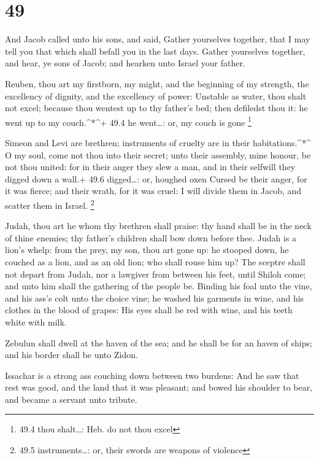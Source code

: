 \hypertarget{section-48}{%
\section{49}\label{section-48}}

 And Jacob called unto his sons, and said, Gather yourselves
together, that I may tell you that which shall befall you in the last
days.  Gather yourselves together, and hear, ye sons of
Jacob; and hearken unto Israel your father.

 Reuben, thou art my firstborn, my might, and the beginning
of my strength, the excellency of dignity, and the excellency of power:
 Unstable as water, thou shalt not excel; because thou
wentest up to thy father's bed; then defiledst thou it: he went up to my
couch.\^{}*\^{}+ 49.4 he went\ldots: or, my couch is gone \footnote{49.4
  thou shalt\ldots: Heb. do not thou excel}

 Simeon and Levi are brethren; instruments of cruelty are in
their habitations.\^{}*\^{}  O my soul, come not thou into
their secret; unto their assembly, mine honour, be not thou united: for
in their anger they slew a man, and in their selfwill they digged down a
wall.+ 49.6 digged\ldots: or, houghed oxen  Cursed be their
anger, for it was fierce; and their wrath, for it was cruel: I will
divide them in Jacob, and scatter them in Israel. \footnote{49.5
  instruments\ldots: or, their swords are weapons of violence}

 Judah, thou art he whom thy brethren shall praise: thy hand
shall be in the neck of thine enemies; thy father's children shall bow
down before thee.  Judah is a lion's whelp: from the prey,
my son, thou art gone up: he stooped down, he couched as a lion, and as
an old lion; who shall rouse him up?  The sceptre shall not
depart from Judah, nor a lawgiver from between his feet, until Shiloh
come; and unto him shall the gathering of the people be. 
Binding his foal unto the vine, and his ass's colt unto the choice vine;
he washed his garments in wine, and his clothes in the blood of grapes:
 His eyes shall be red with wine, and his teeth white with
milk.

 Zebulun shall dwell at the haven of the sea; and he shall
be for an haven of ships; and his border shall be unto Zidon.

 Issachar is a strong ass couching down between two
burdens:  And he saw that rest was good, and the land that
it was pleasant; and bowed his shoulder to bear, and became a servant
unto tribute.

